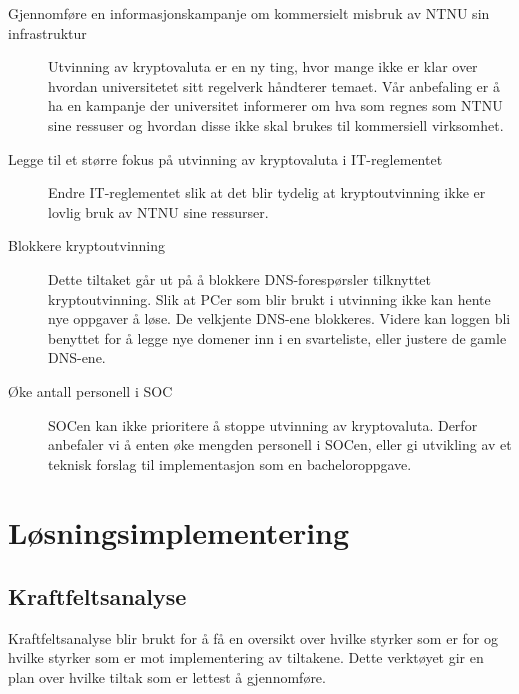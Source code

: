 \begin{description}
    \item[Gjennomføre en informasjonskampanje om kommersielt misbruk av NTNU sin infrastruktur] Utvinning av kryptovaluta er en ny ting, hvor mange ikke er klar over hvordan universitetet sitt regelverk håndterer temaet. Vår anbefaling er å ha en kampanje der universitet informerer om hva som regnes som NTNU sine ressuser og hvordan disse ikke skal brukes til kommersiell virksomhet.
    \item[Legge til et større fokus på utvinning av kryptovaluta i IT-reglementet] Endre IT-reglementet slik at det blir tydelig at kryptoutvinning ikke er lovlig bruk av NTNU sine ressurser. 
    \item[Blokkere kryptoutvinning] Dette tiltaket går ut på å blokkere DNS-forespørsler tilknyttet kryptoutvinning. Slik at PCer som blir brukt i utvinning ikke kan hente nye oppgaver å løse. De velkjente DNS-ene blokkeres. Videre kan loggen bli benyttet for å legge nye domener inn i en svarteliste, eller justere de gamle DNS-ene.
    \item[Øke antall personell i SOC] SOCen kan ikke prioritere å stoppe utvinning av kryptovaluta. Derfor anbefaler vi å enten øke mengden personell i SOCen, eller gi utvikling av et teknisk forslag til implementasjon som en bacheloroppgave.
\end{description}

\section{Løsningsimplementering}
\subsection{Kraftfeltsanalyse} 
Kraftfeltsanalyse blir brukt for å få en oversikt over hvilke styrker som er for og hvilke styrker som er mot implementering av tiltakene. Dette verktøyet gir en plan over hvilke tiltak som er lettest å gjennomføre.  

